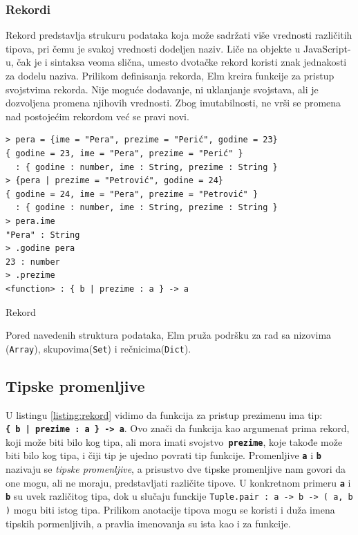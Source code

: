\documentclass[12pt,oneside]{memoir}
\begin{document}
\subsubsection{Rekordi} 
Rekord predstavlja strukuru podataka koja može sadržati više vrednosti različitih tipova, 
pri čemu je svakoj vrednosti dodeljen naziv. Liče na objekte u JavaScript-u, čak je i 
sintaksa veoma slična, umesto dvotačke rekord koristi znak jednakosti za dodelu naziva.
Prilikom definisanja rekorda, Elm kreira funkcije za pristup svojstvima rekorda. Nije 
moguće dodavanje, ni uklanjanje svojstava, ali je dozvoljena promena njihovih vrednosti.
Zbog imutabilnosti, ne vrši se promena nad postojećim rekordom već se pravi novi.
\begin{listing}[h]
\begin{verbatim}
> pera = {ime = "Pera", prezime = "Perić", godine = 23}
{ godine = 23, ime = "Pera", prezime = "Perić" } 
  : { godine : number, ime : String, prezime : String }
> {pera | prezime = "Petrović", godine = 24}
{ godine = 24, ime = "Pera", prezime = "Petrović" }
  : { godine : number, ime : String, prezime : String }
> pera.ime
"Pera" : String
> .godine pera
23 : number
> .prezime
<function> : { b | prezime : a } -> a
\end{verbatim}
\caption{Rekord}
\label{listing:rekord}
\end{listing}

Pored navedenih struktura podataka, Elm pruža podršku za rad sa nizovima (\texttt{Array}),
skupovima(\texttt{Set}) i rečnicima(\texttt{Dict}).

\subsection{Tipske promenljive} 
U listingu \ref{listing:rekord} vidimo da funkcija za pristup prezimenu ima tip:\\ 
\texttt{\textbf{\{ b | prezime : a \} -> a}}. Ovo znači da funkcija kao argumenat
prima rekord, koji može biti bilo kog tipa, ali mora imati svojstvo\texttt{\textbf{
prezime}}, koje takođe može biti bilo kog tipa, i čiji tip je ujedno povrati tip 
funkcije. Promenljive \texttt{\textbf{a}} i \texttt{\textbf{b}} nazivaju se 
\emph{tipske promenljive}, a prisustvo dve tipske promenljive nam govori da one mogu, 
ali ne moraju, predstavljati različite tipove. U konkretnom primeru \texttt{\textbf{a}}
i \texttt{\textbf{b}} su uvek različitog tipa, dok u slučaju funckije \texttt{Tuple.pair
: a -> b -> ( a, b )} mogu biti istog tipa. Prilikom anotacije tipova mogu se koristi i
duža imena tipskih pormenljivih, a pravlia imenovanja su ista kao i za funkcije.
\end{document}
